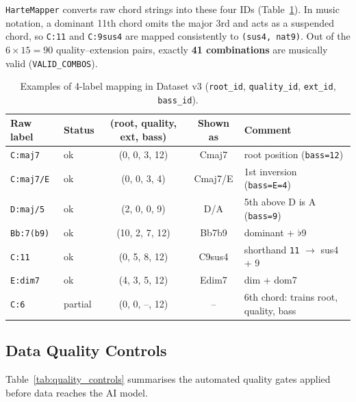 \documentclass[a4paper]{article}
\begin{document}
\texttt{HarteMapper} converts raw chord strings into these four IDs (Table~\ref{tab:label_examples}). In music notation, a dominant 11th chord omits the major 3rd and acts as a suspended chord, so \texttt{C:11} and \texttt{C:9sus4} are mapped consistently to \texttt{(sus4, nat9)}. Out of the $6 \times 15 = 90$ quality--extension pairs, exactly \textbf{41 combinations} are musically valid (\texttt{VALID\_COMBOS}).

\begin{table}[H]
    \centering
    \small
    \begin{tabular}{@{}llccl@{}}
        \toprule
        \textbf{Raw label} & \textbf{Status} & \textbf{(root, quality, ext, bass)} & \textbf{Shown as} & \textbf{Comment} \\
        \midrule
        \texttt{C:maj7}      & ok      & (0, 0, 3, 12)  & Cmaj7    & root position (\texttt{bass=12}) \\
        \texttt{C:maj7/E}    & ok      & (0, 0, 3, 4)   & Cmaj7/E  & 1st inversion (\texttt{bass=E=4}) \\
        \texttt{D:maj/5}     & ok      & (2, 0, 0, 9)   & D/A      & 5th above D is A (\texttt{bass=9}) \\
        \texttt{Bb:7(b9)}    & ok      & (10, 2, 7, 12) & Bb7b9    & dominant + $\flat$9 \\
        \texttt{C:11}        & ok      & (0, 5, 8, 12)  & C9sus4   & shorthand \texttt{11} $\to$ sus4 + 9 \\
        \texttt{E:dim7}      & ok      & (4, 3, 5, 12)  & Edim7    & dim + dom7 \\
        \texttt{C:6}         & partial & (0, 0, --, 12) & --       & 6th chord: trains root, quality, bass \\
        \bottomrule
    \end{tabular}
    \caption{Examples of 4-label mapping in Dataset v3 (\texttt{root\_id}, \texttt{quality\_id}, \texttt{ext\_id}, \texttt{bass\_id}).}
    \label{tab:label_examples}
\end{table}

\subsection{Data Quality Controls}

Table~\ref{tab:quality_controls} summarises the automated quality gates applied before data reaches the AI model.
\end{document}

